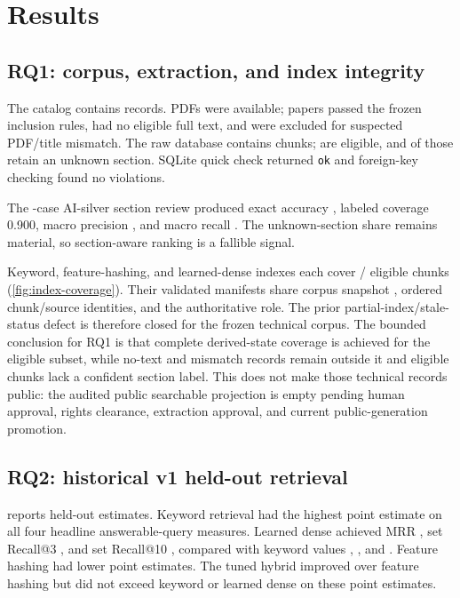\chapter{Results}
\label{ch:results}

\section{RQ1: corpus, extraction, and index integrity}

The catalog contains \CatalogPaperCount{} records. \AvailablePdfCount{} PDFs were available; \EligiblePaperCount{} papers passed the frozen inclusion rules, \NoTextPaperCount{} had no eligible full text, and \MismatchPaperCount{} were excluded for suspected PDF/title mismatch. The raw database contains \RawChunkCount{} chunks; \EligibleChunkCount{} are eligible, and \EligibleUnknownChunkCount{} of those retain an unknown section. SQLite quick check returned \texttt{ok} and foreign-key checking found no violations.

The \SectionSilverCaseCount{}-case AI-silver section review produced exact accuracy \SectionSilverAccuracy{}, labeled coverage 0.900, macro precision \SectionSilverMacroPrecision{}, and macro recall \SectionSilverMacroRecall{}. The unknown-section share remains material, so section-aware ranking is a fallible signal.

Keyword, feature-hashing, and learned-dense indexes each cover \EligibleChunkCount{}/\EligibleChunkCount{} eligible chunks (\cref{fig:index-coverage}). Their validated manifests share corpus snapshot \texttt{\CorpusSnapshotId}, ordered chunk/source identities, and the authoritative role. The prior partial-index/stale-status defect is therefore closed for the frozen technical corpus. The bounded conclusion for RQ1 is that complete derived-state coverage is achieved for the eligible subset, while \NoTextPaperCount{} no-text and \MismatchPaperCount{} mismatch records remain outside it and \EligibleUnknownChunkCount{} eligible chunks lack a confident section label. This does not make those technical records public: the audited public searchable projection is empty pending human approval, rights clearance, extraction approval, and current public-generation promotion.

\section{RQ2: historical v1 held-out retrieval}

 reports held-out estimates. Keyword retrieval had the highest point estimate on all four headline answerable-query measures. Learned dense achieved MRR \RetrievalDenseMrr{}, set Recall@3 \RetrievalDenseRecallThree{}, and set Recall@10 \RetrievalDenseRecallTen{}, compared with keyword values \RetrievalKeywordMrr{}, \RetrievalKeywordRecallThree{}, and \RetrievalKeywordRecallTen{}. Feature hashing had lower point estimates. The tuned hybrid improved over feature hashing but did not exceed keyword or learned dense on these point estimates.

